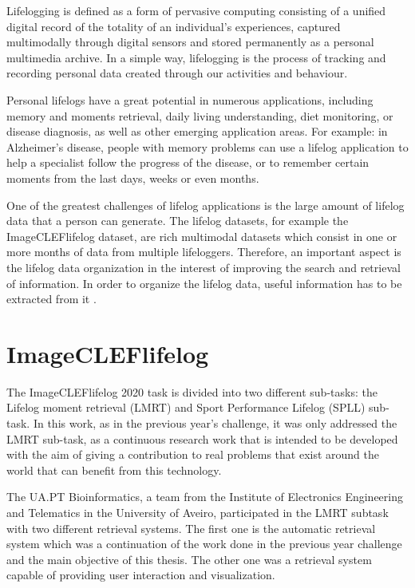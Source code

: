 Lifelogging is defined as a form of pervasive computing consisting of a unified digital record of the totality of an individual’s experiences, captured multimodally through digital sensors and stored permanently as a personal multimedia archive. In a simple way, lifelogging is the process of tracking and recording personal data created through our activities and behaviour.

Personal lifelogs have a great potential in numerous applications, including memory and moments retrieval, daily living understanding, diet monitoring, or disease diagnosis, as well as other emerging application areas. For example: in Alzheimer’s disease, people with memory problems can use a lifelog application to help a specialist follow the progress of the disease, or to remember certain moments from the last days, weeks or even months.

One of the greatest challenges of lifelog applications is the large amount of lifelog data that a person can generate. The lifelog datasets, for example the ImageCLEFlifelog dataset, are rich multimodal datasets which consist in one or more months of data from multiple lifeloggers. Therefore, an important aspect is the lifelog data organization in the interest of improving the search and retrieval of information. In order to organize the lifelog data, useful information has to be extracted from it \cite{Ribeiro2019} \cite{Ribeiro2020}.

\newpage
\section{ImageCLEFlifelog}

\label{sec:imagecleflifelog}


The ImageCLEFlifelog 2020 task is divided into two different sub-tasks: the Lifelog moment retrieval (LMRT) and Sport Performance Lifelog (SPLL) sub-task. In this work, as in the previous year’s challenge, it was only addressed the LMRT sub-task, as a continuous research work that is intended to be developed with the aim of giving a contribution to real problems that exist around the world that can benefit from this technology.
    
The UA.PT Bioinformatics, a team from the Institute of Electronics Engineering and Telematics in the University of Aveiro, participated in the LMRT subtask with two different retrieval systems. The first one is the automatic retrieval system which was a continuation of the work done in the previous year challenge \cite{Ribeiro2019} and the main objective of this thesis. The other one was a retrieval system capable of providing user interaction and visualization. 


